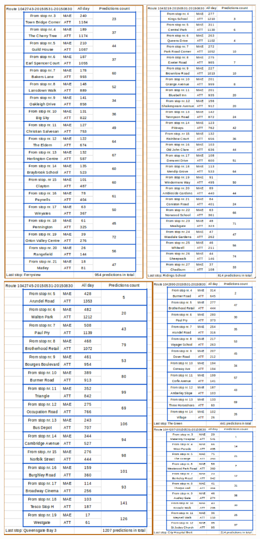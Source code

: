 \documentclass[12pt,a4paper,oneside,openright]{report}
\begin{document}
\includegraphics[width=\textwidth]{figs/routes_1042743_1043218.png}
\includegraphics[width=\textwidth]{figs/routes_1042745_1042890_1044287.png}
\end{document}
